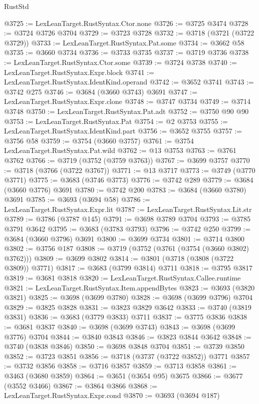 \begin{lexlean}{RustStd}
\begin{coremodule}
{\begin{coremodule}
{{{{{{{{{{{{{{{{{{{{{{{{{{{{{{{{{{{{{{{{{{{{{{{@3725 := LexLeanTarget.RustSyntax.Ctor.none
@3726 := @3725 @3474
@3728 := @3724 @3726 @3704
@3729 := @3723 @3728
@3732 := @3718 (@3721 (@3722 @3729))
@3733 := LexLeanTarget.RustSyntax.Pat.some
@3734 := @3662 @58
@3735 := @3660 @3734
@3736 := @3733 @3735
@3737 := @3719 @3736
@3738 := LexLeanTarget.RustSyntax.Ctor.some
@3739 := @3724 @3738
@3740 := LexLeanTarget.RustSyntax.Expr.block
@3741 := LexLeanTarget.RustSyntax.IdentKind.operand
@3742 := @3652 @3741
@3743 := @3742 @275
@3746 := @3684 (@3660 @3743) @3691
@3747 := LexLeanTarget.RustSyntax.Expr.clone
@3748 := @3747 @3734
@3749 := @3714 @3748
@3750 := LexLeanTarget.RustSyntax.Pat.adt
@3752 := @3750 @90 @90
@3753 := LexLeanTarget.RustSyntax.Pat
@3754 := @2 @3753
@3755 := LexLeanTarget.RustSyntax.IdentKind.part
@3756 := @3652 @3755
@3757 := @3756 @58
@3759 := @3754 (@3660 @3757)
@3761 := @3754 LexLeanTarget.RustSyntax.Pat.wild
@3762 := @13 @3753
@3763 := @3761 @3762
@3766 := @3719 (@3752 (@3759 @3763))
@3767 := @3699 @3757
@3770 := @3718 (@3766 (@3722 @3767))
@3771 := @13 @3717
@3773 := @3749 (@3770 @3771)
@3775 := @3683 (@3746 @3773)
@3776 := @3742 @289
@3779 := @3684 (@3660 @3776) @3691
@3780 := @3742 @200
@3783 := @3684 (@3660 @3780) @3691
@3785 := @3693 (@3694 @58)
@3786 := LexLeanTarget.RustSyntax.Expr.lit
@3787 := LexLeanTarget.RustSyntax.Lit.str
@3789 := @3786 (@3787 @145)
@3791 := @3698 @3789 @3704
@3793 := @3785 @3791 @3642
@3795 := @3683 (@3783 @3793)
@3796 := @3742 @250
@3799 := @3684 (@3660 @3796) @3691
@3800 := @3699 @3734
@3801 := @3714 @3800
@3802 := @3756 @187
@3808 := @3719 (@3752 (@3761 (@3754 (@3660 @3802) @3762)))
@3809 := @3699 @3802
@3814 := @3801 (@3718 (@3808 (@3722 @3809)) @3771)
@3817 := @3683 (@3799 @3814) @3711
@3818 := @3795 @3817
@3819 := @3681 @3818
@3820 := LexLeanTarget.RustSyntax.Callee.runtime
@3821 := LexLeanTarget.RustSyntax.Item.appendBytes
@3823 := @3693 (@3820 @3821)
@3825 := @3698 (@3699 @3780)
@3828 := @3698 (@3699 @3796) @3704
@3829 := @3825 @3828
@3831 := @3823 @3829 @3642
@3833 := @3740 (@3819 @3831)
@3836 := @3683 (@3779 @3833) @3711
@3837 := @3775 @3836
@3838 := @3681 @3837
@3840 := @3698 (@3699 @3743)
@3843 := @3698 (@3699 @3776) @3704
@3844 := @3840 @3843
@3846 := @3823 @3844 @3642
@3848 := @3740 (@3838 @3846)
@3850 := @3698 @3848 @3704
@3851 := @3739 @3850
@3852 := @3723 @3851
@3856 := @3718 (@3737 (@3722 @3852)) @3771
@3857 := @3732 @3856
@3858 := @3716 @3857
@3859 := @3713 @3858
@3861 := @3463 (@3680 @3859)
@3864 := @3651 (@3654 @95) @3675
@3866 := @3677 (@3552 @3466)
@3867 := @3864 @3866
@3868 := LexLeanTarget.RustSyntax.Expr.cond
@3870 := @3693 (@3694 @187)
}}}}}}}}}}}}}}}}}}}}}}}}}}}}}}}}}}}}}}}}}}}}}}}
\end{coremodule}}
\end{coremodule}
\end{lexlean}
